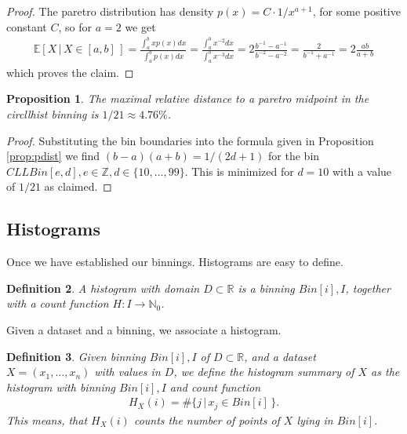 \documentclass{article}
\theoremstyle{plain}
\newtheorem{definition}{Definition}[section]
\newtheorem{proposition}[definition]{Proposition}
\theoremstyle{remark}
\newcommand{\IE}{\mathbb{E}}
\newcommand{\IN}{\mathbb{N}}
\newcommand{\IR}{\mathbb{R}}
\newcommand{\IZ}{\mathbb{Z}}
\newcommand{\ra}{\rightarrow}
\begin{document}
\begin{proof}
  The paretro distribution has density $p(x) =C \cdot 1/x^{a+1}$, for some positive constant $C$, so for $a=2$ we get
  \begin{align*}
    \IE[ X \, | \, X \in [a,b] \,] = \frac{\int_a^b x p(x) dx}{\int_a^b p(x) dx}
    = \frac{\int_a^b x^{-2}  dx}{\int_a^b x^{-3} dx} = 2 \frac{b^{-1} - a^{-1}}{b^{-2}- a^{-2}}
    = \frac{2}{b^{-1} + a^{-1}}
    = 2 \frac{ab}{a + b}
  \end{align*}
  which proves the claim.
\end{proof}

\begin{proposition}\label{prop:21}
  The maximal relative distance to a paretro midpoint in the circllhist binning is $1/21 \approx 4.76\%$.
\end{proposition}

\begin{proof}
  Substituting the bin boundaries into the formula given in Proposition \ref{prop:pdist} we find
  $(b - a)(a + b) = 1/(2d + 1)$ for the bin $CLLBin[e,d], e \in \IZ, d \in \{ 10, \dots, 99 \}$.
  This is minimized for $d = 10$ with a value of $1/21$ as claimed.
\end{proof}

\subsection{Histograms}

Once we have established our binnings. Histograms are easy to define.

\begin{definition}
  A histogram with domain $D \subset \IR$ is a binning $Bin[i],I$, together with a count function $H: I \ra \IN_{0}$.
\end{definition}

Given a dataset and a binning, we associate a histogram.

\begin{definition}
  Given binning $Bin[i],I$ of $D \subset \IR$, and a dataset $X = (x_1,\dots,x_n)$ with values in
  $D$, we define the histogram summary of $X$ as the histogram with binning $Bin[i],I$ and count
  function
  \begin{align*}
    H_X(i) = \# \{ j \, | \, x_j \in Bin[i] \, \}.
  \end{align*}
  This means, that $H_X(i)$ counts the number of points of $X$ lying in $Bin[i]$.
\end{definition}
\end{document}
